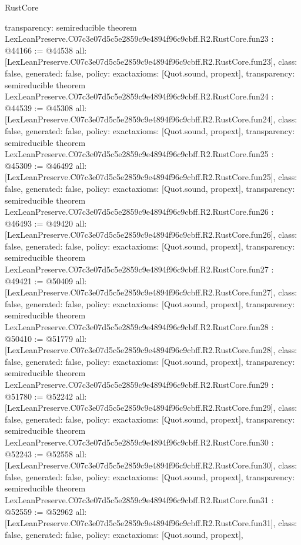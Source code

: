 \begin{lexlean}{RustCore}
\begin{coremodule}
{  transparency: semireducible
}
theorem LexLeanPreserve.C07c3e07d5c5e2859c9e4894f96c9cbff.R2.RustCore.fun23 : @44166 := @44538 {
  all: [LexLeanPreserve.C07c3e07d5c5e2859c9e4894f96c9cbff.R2.RustCore.fun23],
  class: false,
  generated: false,
  policy: exact{axioms: [Quot.sound, propext]},
  transparency: semireducible
}
theorem LexLeanPreserve.C07c3e07d5c5e2859c9e4894f96c9cbff.R2.RustCore.fun24 : @44539 := @45308 {
  all: [LexLeanPreserve.C07c3e07d5c5e2859c9e4894f96c9cbff.R2.RustCore.fun24],
  class: false,
  generated: false,
  policy: exact{axioms: [Quot.sound, propext]},
  transparency: semireducible
}
theorem LexLeanPreserve.C07c3e07d5c5e2859c9e4894f96c9cbff.R2.RustCore.fun25 : @45309 := @46492 {
  all: [LexLeanPreserve.C07c3e07d5c5e2859c9e4894f96c9cbff.R2.RustCore.fun25],
  class: false,
  generated: false,
  policy: exact{axioms: [Quot.sound, propext]},
  transparency: semireducible
}
theorem LexLeanPreserve.C07c3e07d5c5e2859c9e4894f96c9cbff.R2.RustCore.fun26 : @46493 := @49420 {
  all: [LexLeanPreserve.C07c3e07d5c5e2859c9e4894f96c9cbff.R2.RustCore.fun26],
  class: false,
  generated: false,
  policy: exact{axioms: [Quot.sound, propext]},
  transparency: semireducible
}
theorem LexLeanPreserve.C07c3e07d5c5e2859c9e4894f96c9cbff.R2.RustCore.fun27 : @49421 := @50409 {
  all: [LexLeanPreserve.C07c3e07d5c5e2859c9e4894f96c9cbff.R2.RustCore.fun27],
  class: false,
  generated: false,
  policy: exact{axioms: [Quot.sound, propext]},
  transparency: semireducible
}
theorem LexLeanPreserve.C07c3e07d5c5e2859c9e4894f96c9cbff.R2.RustCore.fun28 : @50410 := @51779 {
  all: [LexLeanPreserve.C07c3e07d5c5e2859c9e4894f96c9cbff.R2.RustCore.fun28],
  class: false,
  generated: false,
  policy: exact{axioms: [Quot.sound, propext]},
  transparency: semireducible
}
theorem LexLeanPreserve.C07c3e07d5c5e2859c9e4894f96c9cbff.R2.RustCore.fun29 : @51780 := @52242 {
  all: [LexLeanPreserve.C07c3e07d5c5e2859c9e4894f96c9cbff.R2.RustCore.fun29],
  class: false,
  generated: false,
  policy: exact{axioms: [Quot.sound, propext]},
  transparency: semireducible
}
theorem LexLeanPreserve.C07c3e07d5c5e2859c9e4894f96c9cbff.R2.RustCore.fun30 : @52243 := @52558 {
  all: [LexLeanPreserve.C07c3e07d5c5e2859c9e4894f96c9cbff.R2.RustCore.fun30],
  class: false,
  generated: false,
  policy: exact{axioms: [Quot.sound, propext]},
  transparency: semireducible
}
theorem LexLeanPreserve.C07c3e07d5c5e2859c9e4894f96c9cbff.R2.RustCore.fun31 : @52559 := @52962 {
  all: [LexLeanPreserve.C07c3e07d5c5e2859c9e4894f96c9cbff.R2.RustCore.fun31],
  class: false,
  generated: false,
  policy: exact{axioms: [Quot.sound, propext]},
}
\end{coremodule}
\end{lexlean}
